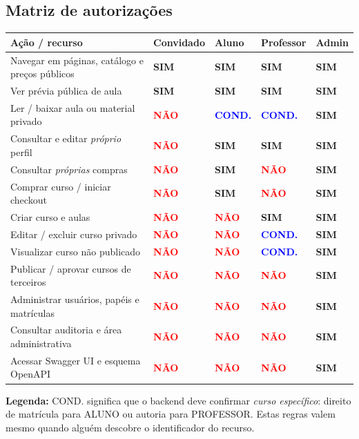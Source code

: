 \documentclass[10pt,a4paper,oneside]{extarticle}
\newcommand{\good}{\textcolor{yes}{\textbf{SIM}}}
\newcommand{\deny}{\textcolor{red}{\textbf{NÃO}}}
\newcommand{\conditional}{\textcolor{blue}{\textbf{COND.}}}
\newcommand{\smalltable}{\fontsize{9}{11}\selectfont}
\begin{document}
\subsection{Matriz de autorizações}
{\smalltable
\begin{tabularx}{\textwidth}{@{}Y L{1.55cm} L{1.55cm} L{1.55cm} L{1.40cm}@{}}\toprule
\textbf{Ação / recurso} & \textbf{Convidado} & \textbf{Aluno} & \textbf{Professor} & \textbf{Admin}\\\midrule
Navegar em páginas, catálogo e preços públicos & \good & \good & \good & \good\\
Ver prévia pública de aula & \good & \good & \good & \good\\
Ler / baixar aula ou material privado & \deny & \conditional & \conditional & \good\\
Consultar e editar \emph{próprio} perfil & \deny & \good & \good & \good\\
Consultar \emph{próprias} compras & \deny & \good & \deny & \good\\
Comprar curso / iniciar checkout & \deny & \good & \deny & \good\\
Criar curso e aulas & \deny & \deny & \good & \good\\
Editar / excluir curso privado & \deny & \deny & \conditional & \good\\
Visualizar curso não publicado & \deny & \deny & \conditional & \good\\
Publicar / aprovar cursos de terceiros & \deny & \deny & \deny & \good\\
Administrar usuários, papéis e matrículas & \deny & \deny & \deny & \good\\
Consultar auditoria e área administrativa & \deny & \deny & \deny & \good\\
Acessar Swagger UI e esquema OpenAPI & \deny & \deny & \deny & \good\\
\bottomrule\end{tabularx}}
\vspace{1mm}
{\footnotesize\textbf{Legenda:} COND. significa que o backend deve confirmar \emph{curso específico}: direito de matrícula para ALUNO ou autoria para PROFESSOR. Estas regras valem mesmo quando alguém descobre o identificador do recurso.}
\end{document}
